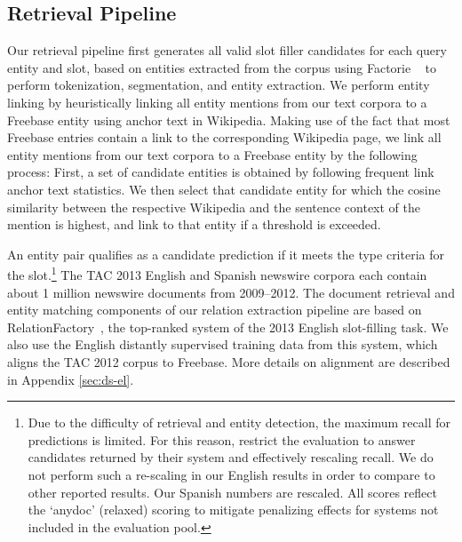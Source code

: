 
\subsection{Retrieval Pipeline \label{sec:pipeline}}
Our retrieval pipeline first generates all valid slot filler candidates for each query entity and slot, based on entities extracted from the corpus using {\sc Factorie} ~\citep{mccallum09:factorie:} to perform tokenization, segmentation, and entity extraction. We perform entity linking by heuristically linking all entity mentions from our text corpora to a Freebase entity using anchor text in Wikipedia. Making use of the fact that most Freebase entries contain a link to the corresponding Wikipedia page, we link all entity mentions from our text corpora to a Freebase entity by the following process:
First, a set of candidate entities is obtained by following frequent link anchor text statistics.
We then select that candidate entity for which the cosine similarity between the respective Wikipedia and the sentence context of the mention is highest, and link to that entity if a threshold is exceeded.

An entity pair qualifies as a candidate prediction if it meets the type criteria for the slot.\footnote{Due to the difficulty of retrieval and entity detection, the maximum recall for predictions is limited. For this reason, \citet{surdeanu2012multi} restrict the evaluation to answer candidates returned by their system and effectively rescaling recall. We do not perform such a re-scaling in our English results in order to compare to other reported results. Our Spanish numbers are rescaled. All scores reflect the `anydoc' (relaxed) scoring to mitigate penalizing effects for systems not included in the evaluation pool.} The TAC 2013 English and Spanish newswire corpora each contain about 1 million newswire documents from 2009--2012. The document retrieval and entity matching components of our relation extraction pipeline are based on RelationFactory~\citep{roth2014relationfactory}, the top-ranked system of the 2013 English slot-filling task. We also use the English distantly supervised training data from this system, which aligns the TAC 2012 corpus to Freebase.
 More details on alignment are described in Appendix \ref{sec:ds-el}.

